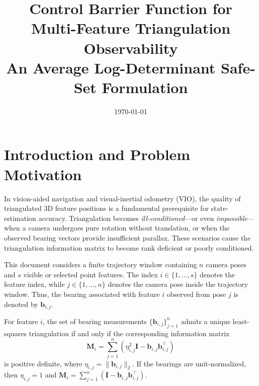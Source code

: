 \documentclass[11pt,a4paper]{article}
\begin{document}
\title{\textbf{Control Barrier Function for Multi-Feature Triangulation Observability}\\[4pt]
       \large An Average Log-Determinant Safe-Set Formulation}
\author{}
\date{\today}
\maketitle
\tableofcontents
\bigskip

\section{Introduction and Problem Motivation}

In vision-aided navigation and visual-inertial odometry (VIO), the quality of
triangulated 3D feature positions is a fundamental prerequisite for
state-estimation accuracy.  Triangulation becomes \emph{ill-conditioned}---or
even \emph{impossible}---when a camera undergoes pure rotation without
translation, or when the observed bearing vectors provide insufficient
parallax.  These scenarios cause the triangulation information matrix to
become rank deficient or poorly conditioned.

This document considers a finite trajectory window containing $n$ camera poses
and $s$ visible or selected point features.  The index
$i\in\{1,\ldots,s\}$ denotes the feature index, while
$j\in\{1,\ldots,n\}$ denotes the camera pose inside the trajectory window.
Thus, the bearing associated with feature $i$ observed from pose $j$ is denoted
by $\bm{b}_{i,j}$.

\begin{definition}
For feature $i$, the set of bearing measurements
$\{\bm{b}_{i,j}\}_{j=1}^{n}$ admits a unique least-squares triangulation if
and only if the corresponding information matrix
\begin{equation}
  \bm{M}_{i}
  = \sum_{j=1}^{n}\left(\eta_{i,j}^{2}\bm{I}
  - \bm{b}_{i,j}\bm{b}_{i,j}^{\top}\right)
  \label{eq:intro_Mi}
\end{equation}
is positive definite, where $\eta_{i,j}=\|\bm{b}_{i,j}\|_2$.  If the bearings
are unit-normalized, then $\eta_{i,j}=1$ and
$\bm{M}_{i}=\sum_{j=1}^{n}(\bm{I}-\bm{b}_{i,j}\bm{b}_{i,j}^{\top})$.
\end{definition}
\end{document}

